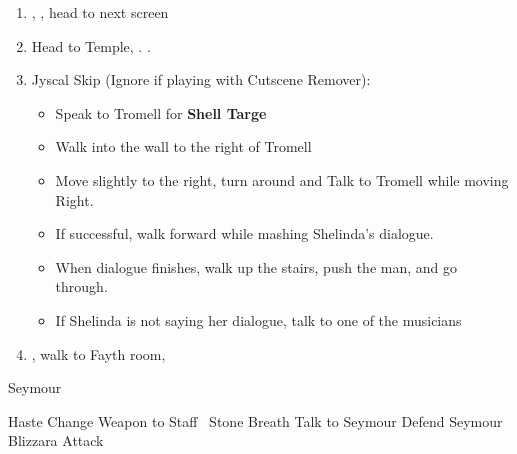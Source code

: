 \begin{enumerate}[resume]
    \item \sd, \cs[0:40], head to next screen
    \item Head to Temple, \sd. \save.
    \item Jyscal Skip (Ignore if playing with Cutscene Remover):
    \begin{itemize}
        \item Speak to Tromell for \textbf{Shell Targe}
        \item Walk into the wall to the right of Tromell
        \item Move slightly to the right, turn around and Talk to Tromell while moving Right.
        \item If successful, walk forward while mashing Shelinda's dialogue.
        \item When dialogue finishes, walk up the stairs, push the man, and go through.
        \item If Shelinda is not saying her dialogue, talk to one of the musicians
    \end{itemize}
    \item \sd, walk to Fayth room, \cs[2:10]
\end{enumerate}
\begin{battle}[3000]{Seymour}
    \begin{itemize}
        \tidusf Haste \tidus
        \yunaf Change Weapon to Staff
        \kimahrif \od\ Stone Breath
        \tidusf Talk to Seymour
        \switch{\yuna}{\auron}
        \auronf Defend
        \enemyf Seymour Blizzara
        \tidusf Attack
    \end{itemize}
\end{battle}
